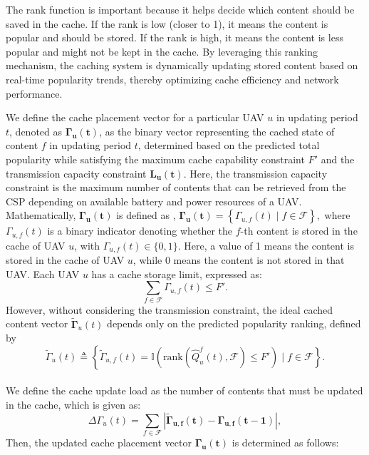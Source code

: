 \documentclass[journal]{IEEEtran}
\begin{document}
The rank function is important because it helps decide which content should be saved in the cache. If the rank is low (closer to 1), it means the content is popular and should be stored. If the rank is high, it means the content is less popular and might not be kept in the cache. By leveraging this ranking mechanism, the caching system is dynamically updating stored content based on real-time popularity trends, thereby optimizing cache efficiency and network performance.


We define the cache placement vector for a particular UAV \( u \) in updating period \( t \), denoted as $\boldsymbol{\Gamma_{u}(t)}$, as the binary vector representing the cached state of content \( f \) in updating period \( t \), determined based on the predicted total popularity while satisfying the maximum cache capability constraint \( F' \) and the transmission capacity constraint $\boldsymbol{L_u(t)}$. Here, the transmission capacity constraint is the maximum number of contents that can be retrieved from the CSP depending on available battery and power resources of a UAV. Mathematically, $\boldsymbol{\Gamma_{u}(t)}$ is defined as ,
\(
    \boldsymbol{\Gamma_{u}(t)} = \left\{\Gamma_{u,f}(t) \mid f \in \mathcal{F} \right\},  
\) where \( \Gamma_{u,f}(t) \) is a binary indicator denoting whether the \( f \)-th content is stored in the cache of UAV \( u \), with \( \Gamma_{u,f}(t) \in \{0, 1\} \). Here, a value of 1 means the content is stored in the cache of UAV \( u \), while 0 means the content is not stored in that UAV. Each UAV \( u \) has a cache storage limit, expressed as: 
\begin{equation}
    \sum_{f \in \mathcal{F}}  \Gamma_{u,f}(t)\leq F'.
\end{equation} 
However, without considering the transmission constraint, the ideal cached content vector \( \boldsymbol{\tilde{\Gamma}}_u(t) \)
depends only on the predicted popularity ranking, defined by 
\[
    \tilde{\Gamma}_u(t) \triangleq \left\{   \tilde{\Gamma}_{u,f}(t) = \mathbb{I} \left( \text{rank}(\hat{Q}^{f}_{u}(t), \mathcal{F}) \leq F' \right) \mid f \in \mathcal{F} \right\}.
\] \\
We define the cache update load as the number of contents that must be updated in the cache, which is given as:
\begin{equation}
    \Delta \Gamma_{u}(t) = \sum_{f \in \mathcal{F}} \left| \boldsymbol{\tilde{\Gamma}_{u,f}(t)} - \boldsymbol{\Gamma_{u,f}(t-1)} \right|,
\end{equation} Then, the updated cache placement vector \( \boldsymbol{\Gamma_{u}(t)} \) is determined as follows:
\end{document}
